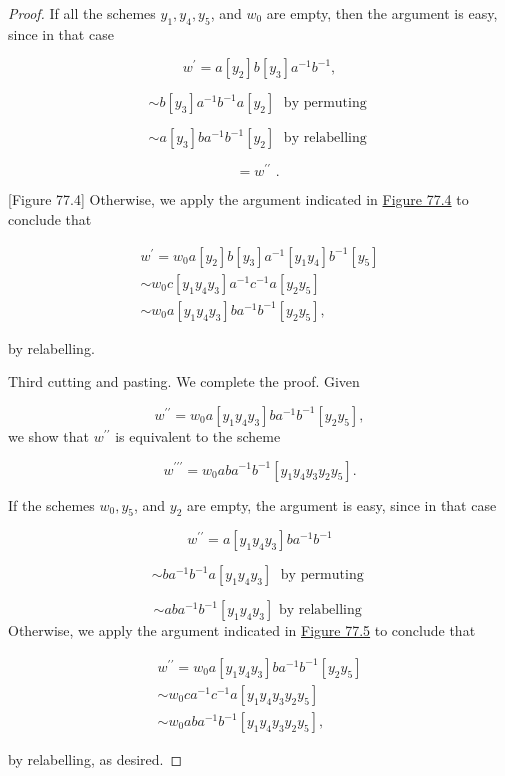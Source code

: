 \begin{proof}
If all the schemes \(y_{1},y_{4},y_{5}\), and \(w_{0}\) are empty, then the argument is easy, since in that case

\[
w^{\prime } = a[ y_{2}] b[ y_{3}] a^{-1}b^{-1},
\]

\[
\sim b[ y_{3}] a^{-1}b^{-1}a[ y_{2}] \;\text{ by permuting }
\]

\[
\sim a[ y_{3}] ba^{-1}b^{-1}[ y_{2}] \;\text{ by relabelling }
\]

\[
= w^{\prime \prime }\text{ . }
\]

[Figure 77.4]
Otherwise, we apply the argument indicated in \hyperref[fig:77.4]{Figure 77.4} to conclude that

\[\begin{gathered}w^{\prime } = w_{0}a[ y_{2}] b[ y_{3}] a^{-1}[ {y_{1}y_{4}}] b^{-1}[ y_{5}] \\ \sim {w}_{0}c[ {y_{1}y_{4}y_{3}}] a^{-1}c^{-1}a[ {y_{2}y_{5}}] \\ \sim {w}_{0}a[ {y_{1}y_{4}y_{3}}] ba^{-1}b^{-1}[ {y_{2}y_{5}}] ,\end{gathered}\]

by relabelling.

Third cutting and pasting. We complete the proof. Given

\[
w^{\prime \prime } = w_{0}a[ {y_{1}y_{4}y_{3}}] ba^{-1}b^{-1}[ {y_{2}y_{5}}] ,
\]
we show that \(w^{\prime \prime }\) is equivalent to the scheme

\[
w^{\prime \prime \prime } = w_{0}{ab}a^{-1}b^{-1}[ {y_{1}y_{4}y_{3}y_{2}y_{5}}] .
\]

If the schemes \(w_{0},y_{5}\), and \(y_{2}\) are empty, the argument is easy, since in that case

\[
w^{\prime \prime } = a[ {y_{1}y_{4}y_{3}}] ba^{-1}b^{-1}
\]

\[
\sim ba^{-1}b^{-1}a[ {y_{1}y_{4}y_{3}}] \;\text{ by permuting }
\]

\[
\sim {ab}a^{-1}b^{-1}[ {y_{1}y_{4}y_{3}}] \text{ by relabelling }
\]
Otherwise, we apply the argument indicated in \hyperref[fig:77.5]{Figure 77.5} to conclude that

\[\begin{gathered}w^{\prime \prime } = w_{0}a[ {y_{1}y_{4}y_{3}}] ba^{-1}b^{-1}[ {y_{2}y_{5}}] \\ \sim {w}_{0}ca^{-1}c^{-1}a[ {y_{1}y_{4}y_{3}y_{2}y_{5}}] \\ \sim {w}_{0}{ab}a^{-1}b^{-1}[ {y_{1}y_{4}y_{3}y_{2}y_{5}}] ,\end{gathered}\]

by relabelling, as desired.
\end{proof}


